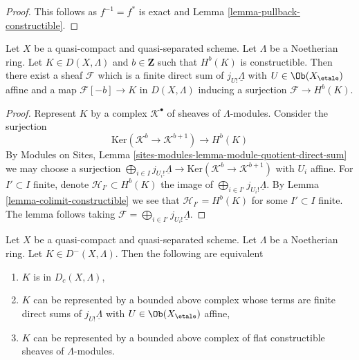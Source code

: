 \begin{proof}
This follows as $f^{-1} = f^*$ is exact and
Lemma \ref{lemma-pullback-constructible}.
\end{proof}

\begin{lemma}
\label{lemma-one-constructible}
Let $X$ be a quasi-compact and quasi-separated scheme.
Let $\Lambda$ be a Noetherian ring. Let $K \in D(X, \Lambda)$
and $b \in \mathbf{Z}$ such that $H^b(K)$ is constructible.
Then there exist a sheaf $\mathcal{F}$ which is a finite direct sum
of $j_{U!}\underline{\Lambda}$ with $U \in \Ob(X_\etale)$ affine and
a map $\mathcal{F}[-b] \to K$ in $D(X, \Lambda)$
inducing a surjection $\mathcal{F} \to H^b(K)$.
\end{lemma}

\begin{proof}
Represent $K$ by a complex $\mathcal{K}^\bullet$ of sheaves of
$\Lambda$-modules. Consider the surjection
$$
\text{Ker}(\mathcal{K}^b \to \mathcal{K}^{b + 1})
\longrightarrow
H^b(K)
$$
By Modules on Sites, Lemma
\ref{sites-modules-lemma-module-quotient-direct-sum}
we may choose a surjection
$\bigoplus_{i \in I} j_{U_i!} \underline{\Lambda} \to
\text{Ker}(\mathcal{K}^b \to \mathcal{K}^{b + 1})$
with $U_i$ affine. For $I' \subset I$ finite, denote
$\mathcal{H}_{I'} \subset H^b(K)$ the image of
$\bigoplus_{i \in I'} j_{U_i!} \underline{\Lambda}$.
By Lemma \ref{lemma-colimit-constructible} we see that
$\mathcal{H}_{I'} = H^b(K)$ for some $I' \subset I$ finite.
The lemma follows taking
$\mathcal{F} = \bigoplus_{i \in I'} j_{U_i!} \underline{\Lambda}$.
\end{proof}

\begin{lemma}
\label{lemma-bounded-above-c}
Let $X$ be a quasi-compact and quasi-separated scheme.
Let $\Lambda$ be a Noetherian ring. Let $K \in D^-(X, \Lambda)$. Then
the following are equivalent
\begin{enumerate}
\item $K$ is in $D_c(X, \Lambda)$,
\item $K$ can be represented by a bounded above complex
whose terms are finite direct sums of $j_{U!}\underline{\Lambda}$
with $U \in \Ob(X_\etale)$ affine,
\item $K$ can be represented by a bounded above complex
of flat constructible sheaves of $\Lambda$-modules.
\end{enumerate}
\end{lemma}

